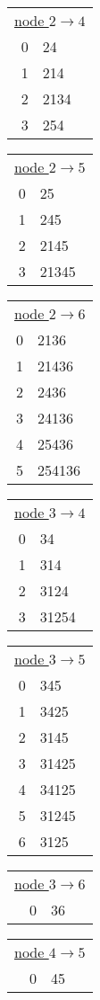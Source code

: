 \begin{table}
\begin{tabular}[t]{rl}
\end{tabular}
\begin{tabular}[t]{rl}
\multicolumn{2}{c}{\underline{node $2 \rightarrow 4$}}\\
0 & 24\\
1 & 214\\
2 & 2134\\
3 & 254
\end{tabular}
\begin{tabular}[t]{rl}
\multicolumn{2}{c}{\underline{node $2 \rightarrow 5$}}\\
0 & 25\\
1 & 245\\
2 & 2145\\
3 & 21345 
\end{tabular}
\begin{tabular}[t]{rl}
\multicolumn{2}{c}{\underline{node $2 \rightarrow 6$}}\\
0 & 2136\\
1 & 21436\\
2 & 2436\\
3 & 24136\\
4 & 25436\\
5 & 254136
\end{tabular}
\begin{tabular}[t]{rl}
\multicolumn{2}{c}{\underline{node $3 \rightarrow 4$}}\\
0 & 34\\
1 & 314\\
2 & 3124\\
3 & 31254 
\end{tabular}
\begin{tabular}[t]{rl}
\multicolumn{2}{c}{\underline{node $3 \rightarrow 5$}}\\
0 & 345\\
1 & 3425\\
2 & 3145\\
3 & 31425\\
4 & 34125\\
5 & 31245 \\
6 & 3125
\end{tabular}
\begin{tabular}[t]{rl}
\multicolumn{2}{c}{\underline{node $3 \rightarrow 6$}}\\
0 & 36
\end{tabular}
\begin{tabular}[t]{rl}
\multicolumn{2}{c}{\underline{node $4 \rightarrow 5$}}\\
0 & 45\\

\end{tabular}
\end{table}
